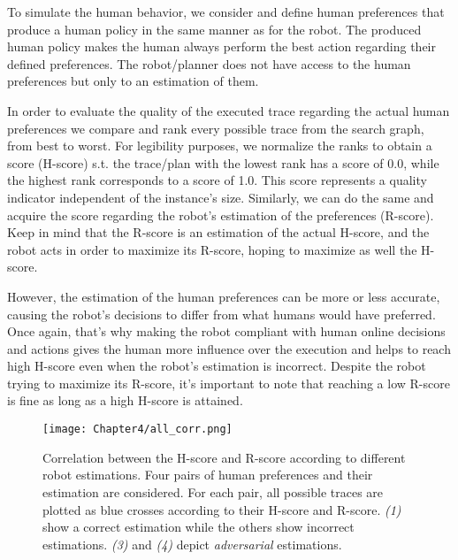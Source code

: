To simulate the human behavior, we consider and define human preferences that produce a human policy in the same manner as for the robot. The produced human policy makes the human always perform the best action regarding their defined preferences. The robot/planner does not have access to the human preferences but only to an estimation of them.

In order to evaluate the quality of the executed trace regarding the actual human preferences we compare and rank every possible trace from the search graph, from best to worst. For legibility purposes, we normalize the ranks to obtain a score (H-score) s.t. the trace/plan with the lowest rank has a score of 0.0, while the highest rank corresponds to a score of 1.0. This score represents a quality indicator independent of the instance's size. 
Similarly, we can do the same and acquire the score regarding the robot's estimation of the preferences (R-score). 
Keep in mind that the R-score is an estimation of the actual H-score, and the robot acts in order to maximize its R-score, hoping to maximize as well the H-score.

However, the estimation of the human preferences can be more or less accurate, causing the robot's decisions to differ from what humans would have preferred. Once again, that's why making the robot compliant with human online decisions and actions gives the human more influence over the execution and helps to reach high H-score even when the robot's estimation is incorrect.
Despite the robot trying to maximize its R-score, it's important to note that reaching a low R-score is fine as long as a high H-score is attained.

\begin{figure}
    \texttt{[image: Chapter4/all\_corr.png]}
    \caption{
    Correlation between the H-score and R-score according to different robot estimations. Four pairs of human preferences and their estimation are considered. For each pair, all possible traces are plotted as blue crosses according to their H-score and R-score. \textit{(1)} show a correct estimation while the others show incorrect estimations. \textit{(3)} and \textit{(4)} depict \textit{adversarial} estimations.
    }
    \label{fig:corr}
\end{figure}


